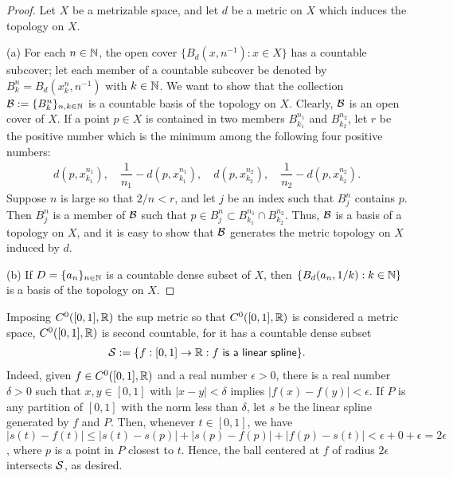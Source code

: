 \begin{proof}
    \hangindent=0.65cm
    Let $X$ be a metrizable space, and let $d$ be a metric on $X$ which induces the topology on $X$.

    \noindent(a)
    For each $n\in{\mathbb{N}}$, the open cover $\{B_d\left(x, n^{-1}\right): x\in X\}$ has a countable subcover; let each member of a countable subcover be denoted by $B_k^n=B_d(x_k^n, n^{-1})$ with $k\in{\mathbb{N}}$.
    We want to show that the collection ${\mathcal{B}}:=\{B_k^n\}_{n, k\in{\mathbb{N}}}$ is a countable basis of the topology on $X$.
    Clearly, ${\mathcal{B}}$ is an open cover of $X$.
    If a point $p\in X$ is contained in two members $B_{k_1}^{n_1}$ and $B_{k_2}^{n_2}$, let $r$ be the positive number which is the minimum among the following four positive numbers:
    \begin{align*}
        d(p, x_{k_1}^{n_1}),\quad\dfrac{1}{n_1}-d(p, x_{k_1}^{n_1}),\quad d(p, x_{k_2}^{n_2}),\quad\dfrac{1}{n_2}-d(p, x_{k_2}^{n_2}).
    \end{align*}
    Suppose $n$ is large so that $2/n<r$, and let $j$ be an index such that $B_j^n$ contains $p$.
    Then $B_j^n$ is a member of ${\mathcal{B}}$ such that $p\in B_j^n\subset B_{k_1}^{n_1}\cap B_{k_2}^{n_2}$.
    Thus, ${\mathcal{B}}$ is a basis of a topology on $X$, and it is easy to show that ${\mathcal{B}}$ generates the metric topology on $X$ induced by $d$.

    \noindent(b)
    If $D=\{a_n\}_{n\in{\mathbb{N}}}$ is a countable dense subset of $X$, then $\{B_d(a_n, 1/k): k\in{\mathbb{N}}\}$ is a basis of the topology on $X$.
\end{proof}
\begin{exmp}
    Imposing $C^0([0, 1], {\mathbb{R}})$ the sup metric so that $C^0([0, 1], {\mathbb{R}})$ is considered a metric space, $C^0([0, 1], {\mathbb{R}})$ is second countable, for it has a countable dense subset
    \begin{align*}
        {\mathcal{S}}:=\{f: [0, 1]\rightarrow{\mathbb{R}}: \textsf{$f$ is a linear spline}\}.
    \end{align*}
    Indeed, given $f\in C^0([0, 1], {\mathbb{R}})$ and a real number $\epsilon>0$, there is a real number $\delta>0$ such that $x, y\in [0, 1]$ with $|x-y|<\delta$ implies $|f(x)-f(y)|<\epsilon$.
    If $P$ is any partition of $[0, 1]$ with the norm less than $\delta$, let $s$ be the linear spline generated by $f$ and $P$.
    Then, whenever $t\in [0, 1]$, we have $|s(t)-f(t)|\leq|s(t)-s(p)|+|s(p)-f(p)|+|f(p)-s(t)|<\epsilon+0+\epsilon=2\epsilon$, where $p$ is a point in $P$ closest to $t$.
    Hence, the ball centered at $f$ of radius $2\epsilon$ intersects ${\mathcal{S}}$, as desired.
\end{exmp}

